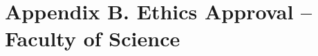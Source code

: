 
\chapter{Appendix B. Ethics Approval -- Faculty of Science} %
\clearpage
\label{AppendixB} %



%

% 
